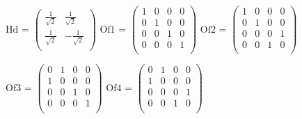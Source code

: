 \noindent\(\text{Hd}\text{ = }\left(
\begin{array}{cc}
    \frac{1}{\sqrt{2}} & \frac{1}{\sqrt{2}} \\
    \frac{1}{\sqrt{2}} & -\frac{1}{\sqrt{2}} \\
\end{array}
\right)\)
\noindent\(\text{Of1}\text{ = }\left(
\begin{array}{cccc}
    1 & 0 & 0 & 0 \\
    0 & 1 & 0 & 0 \\
    0 & 0 & 1 & 0 \\
    0 & 0 & 0 & 1 \\
\end{array}
\right)\)
\noindent\(\text{Of2}\text{ = }\left(
\begin{array}{cccc}
    1 & 0 & 0 & 0 \\
    0 & 1 & 0 & 0 \\
    0 & 0 & 0 & 1 \\
    0 & 0 & 1 & 0 \\
\end{array}
\right)\)

\noindent\(\text{Of3}\text{ = }\left(
\begin{array}{cccc}
    0 & 1 & 0 & 0 \\
    1 & 0 & 0 & 0 \\
    0 & 0 & 1 & 0 \\
    0 & 0 & 0 & 1 \\
\end{array}
\right)\)
\noindent\(\text{Of4}\text{ = }\left(
\begin{array}{cccc}
    0 & 1 & 0 & 0 \\
    1 & 0 & 0 & 0 \\
    0 & 0 & 0 & 1 \\
    0 & 0 & 1 & 0 \\
\end{array}
\right)\)

